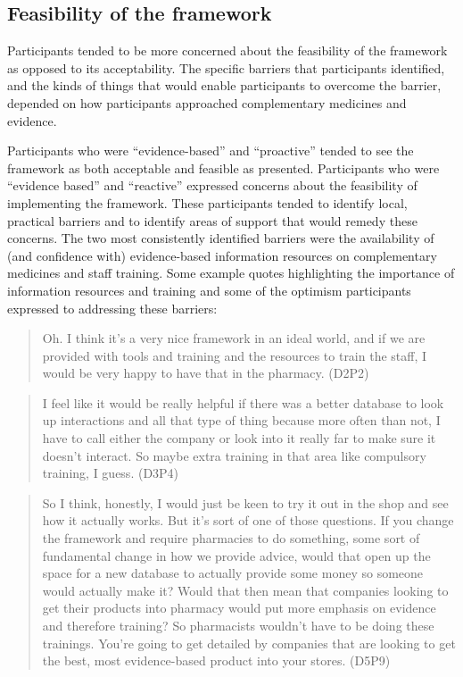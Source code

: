 \documentclass[11pt,a4paper]{article}
\begin{document}
\subsection{Feasibility of the framework}\label{feasibility}

Participants tended to be more concerned about the feasibility of the
framework as opposed to its acceptability. The specific barriers that
participants identified, and the kinds of things that would enable
participants to overcome the barrier, depended on how participants
approached complementary medicines and evidence.

Participants who were ``evidence-based'' and ``proactive'' tended to see
the framework as both acceptable and feasible as presented. Participants
who were ``evidence based'' and ``reactive'' expressed concerns about
the feasibility of implementing the framework. These participants tended
to identify local, practical barriers and to identify areas of support
that would remedy these concerns. The two most consistently identified
barriers were the availability of (and confidence with) evidence-based
information resources on complementary medicines and staff training.
Some example quotes highlighting the importance of information resources
and training and some of the optimism participants expressed to
addressing these barriers:

\begin{quote}
Oh. I think it's a very nice framework in an ideal world, and if we are
provided with tools and training and the resources to train the staff, I
would be very happy to have that in the pharmacy. (D2P2)
\end{quote}

\begin{quote}
I feel like it would be really helpful if there was a better database to
look up interactions and all that type of thing because more often than
not, I have to call either the company or look into it really far to
make sure it doesn't interact. So maybe extra training in that area like
compulsory training, I guess. (D3P4)
\end{quote}

\begin{quote}
So I think, honestly, I would just be keen to try it out in the shop and
see how it actually works. But it's sort of one of those questions. If
you change the framework and require pharmacies to do something, some
sort of fundamental change in how we provide advice, would that open up
the space for a new database to actually provide some money so someone
would actually make it? Would that then mean that companies looking to
get their products into pharmacy would put more emphasis on evidence and
therefore training? So pharmacists wouldn't have to be doing these
trainings. You're going to get detailed by companies that are looking to
get the best, most evidence-based product into your stores. (D5P9)
\end{quote}
\end{document}
